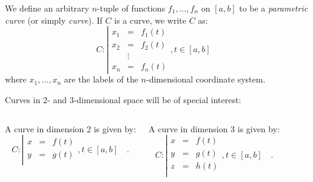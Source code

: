 \begin{frame}
\begin{definition}
We define an arbitrary $n$-tuple of functions $f_1,\dots, f_n$ on $[a,b]$ to be a \emph{parametric curve} (or simply \emph{curve}). If $C$ is a curve, we write $C$ as:
\[
C:\left| 
\begin{array}{rcl}
x_1&=&f_1(t)\\
x_2&=&f_2(t)\\
&\vdots & \\
x_n&=&f_n(t)
\end{array} \right., t\in [a,b]\quad 
\]
where $x_1,\dots, x_n$ are the labels of the $n$-dimensional coordinate system.
\end{definition}
Curves in 2- and 3-dimensional space will be of special interest:
\begin{columns}
A curve in dimension 2 is given by:
\[
C:\left| 
\begin{array}{rcl}
x&=&f(t)\\
y&=&g(t)\\
\end{array} \right., t\in [a,b]\quad .
\]

A curve in dimension 3 is given by:
\[
C:\left| 
\begin{array}{rcl}
x&=&f(t)\\
y&=&g(t)\\
z&=&h(t)\\
\end{array} \right., t\in [a,b]\quad .
\]

\end{columns}

\end{frame}
